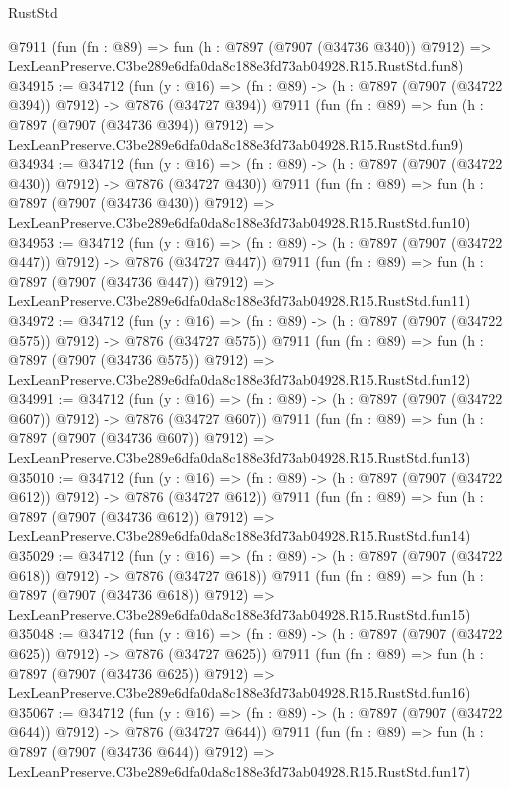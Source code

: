 \begin{lexlean}{RustStd}
\begin{coremodule}
    @7911
    (fun (fn : @89) =>
    fun (h : @7897 (@7907 (@34736 @340)) @7912) =>
    LexLeanPreserve.C3be289e6dfa0da8c188e3fd73ab04928.R15.RustStd.fun8)
@34915 := @34712
    (fun (y : @16) => (fn : @89) -> (h : @7897 (@7907 (@34722 @394)) @7912) -> @7876 (@34727 @394))
    @7911
    (fun (fn : @89) =>
    fun (h : @7897 (@7907 (@34736 @394)) @7912) =>
    LexLeanPreserve.C3be289e6dfa0da8c188e3fd73ab04928.R15.RustStd.fun9)
@34934 := @34712
    (fun (y : @16) => (fn : @89) -> (h : @7897 (@7907 (@34722 @430)) @7912) -> @7876 (@34727 @430))
    @7911
    (fun (fn : @89) =>
    fun (h : @7897 (@7907 (@34736 @430)) @7912) =>
    LexLeanPreserve.C3be289e6dfa0da8c188e3fd73ab04928.R15.RustStd.fun10)
@34953 := @34712
    (fun (y : @16) => (fn : @89) -> (h : @7897 (@7907 (@34722 @447)) @7912) -> @7876 (@34727 @447))
    @7911
    (fun (fn : @89) =>
    fun (h : @7897 (@7907 (@34736 @447)) @7912) =>
    LexLeanPreserve.C3be289e6dfa0da8c188e3fd73ab04928.R15.RustStd.fun11)
@34972 := @34712
    (fun (y : @16) => (fn : @89) -> (h : @7897 (@7907 (@34722 @575)) @7912) -> @7876 (@34727 @575))
    @7911
    (fun (fn : @89) =>
    fun (h : @7897 (@7907 (@34736 @575)) @7912) =>
    LexLeanPreserve.C3be289e6dfa0da8c188e3fd73ab04928.R15.RustStd.fun12)
@34991 := @34712
    (fun (y : @16) => (fn : @89) -> (h : @7897 (@7907 (@34722 @607)) @7912) -> @7876 (@34727 @607))
    @7911
    (fun (fn : @89) =>
    fun (h : @7897 (@7907 (@34736 @607)) @7912) =>
    LexLeanPreserve.C3be289e6dfa0da8c188e3fd73ab04928.R15.RustStd.fun13)
@35010 := @34712
    (fun (y : @16) => (fn : @89) -> (h : @7897 (@7907 (@34722 @612)) @7912) -> @7876 (@34727 @612))
    @7911
    (fun (fn : @89) =>
    fun (h : @7897 (@7907 (@34736 @612)) @7912) =>
    LexLeanPreserve.C3be289e6dfa0da8c188e3fd73ab04928.R15.RustStd.fun14)
@35029 := @34712
    (fun (y : @16) => (fn : @89) -> (h : @7897 (@7907 (@34722 @618)) @7912) -> @7876 (@34727 @618))
    @7911
    (fun (fn : @89) =>
    fun (h : @7897 (@7907 (@34736 @618)) @7912) =>
    LexLeanPreserve.C3be289e6dfa0da8c188e3fd73ab04928.R15.RustStd.fun15)
@35048 := @34712
    (fun (y : @16) => (fn : @89) -> (h : @7897 (@7907 (@34722 @625)) @7912) -> @7876 (@34727 @625))
    @7911
    (fun (fn : @89) =>
    fun (h : @7897 (@7907 (@34736 @625)) @7912) =>
    LexLeanPreserve.C3be289e6dfa0da8c188e3fd73ab04928.R15.RustStd.fun16)
@35067 := @34712
    (fun (y : @16) => (fn : @89) -> (h : @7897 (@7907 (@34722 @644)) @7912) -> @7876 (@34727 @644))
    @7911
    (fun (fn : @89) =>
    fun (h : @7897 (@7907 (@34736 @644)) @7912) =>
    LexLeanPreserve.C3be289e6dfa0da8c188e3fd73ab04928.R15.RustStd.fun17)

\end{coremodule}
\end{lexlean}
